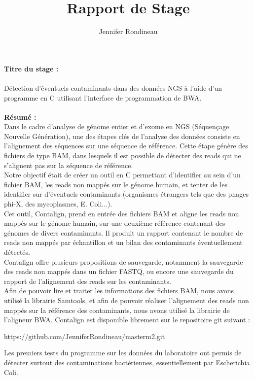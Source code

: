 \documentclass[a4paper,12pt]{article}
\title{Rapport de Stage}
\author{Jennifer Rondineau}
\begin{document}
 

\textbf{Titre du stage :} \\\\

Détection d'éventuels contaminants dans des données NGS à l'aide d'un programme en C utilisant l'interface de programmation de BWA. \\
\\
\textbf{Résumé :} \\

Dans le cadre d'analyse de génome entier et d'exome en NGS (Séquençage Nouvelle Génération), une des étapes clés de l'analyse des données consiste en l'alignement des séquences sur une séquence de référence. Cette étape génère des fichiers de type BAM, dans lesquels il est possible de détecter des reads qui ne s'alignent pas sur la séquence de référence. \\
Notre objectif était de créer un outil en C permettant d'identifier au sein d'un fichier BAM, les reads non mappés sur le génome humain, et tenter de les identifier sur d'éventuels contaminants (organismes étrangers tels que des phages phi-X, des mycoplasmes, E. Coli...). \\
Cet outil, Contalign, prend en entrée des fichiers BAM et aligne les reads non mappés sur le génome humain, sur une deuxième référence contenant des génomes de divers contaminants. Il produit un rapport contenant le nombre de reads non mappés par échantillon et un bilan des contaminants éventuellement détectés. \\


Contalign offre plusieurs propositions de sauvegarde, notamment la sauvegarde des reads non mappés dans un fichier FASTQ, ou encore une sauvegarde du rapport de l'alignement des reads sur les contaminants.\\
Afin de pouvoir lire et traiter les informations des fichiers BAM, nous avons utilisé la librairie Samtools, et afin de pouvoir réaliser l'alignement des reads non mappés sur la référence des contaminants, nous avons utilisé la librairie de l'aligneur BWA. Contalign est disponible librement sur le repositoire git suivant : \begin{center} https://github.com/JenniferRondineau/masterm2.git \end{center}
Les premiers tests du programme sur les données du laboratoire ont permis de détecter surtout des contaminations bactériennes, essentiellement par  Escherichia Coli.\\\\
\end{document}
